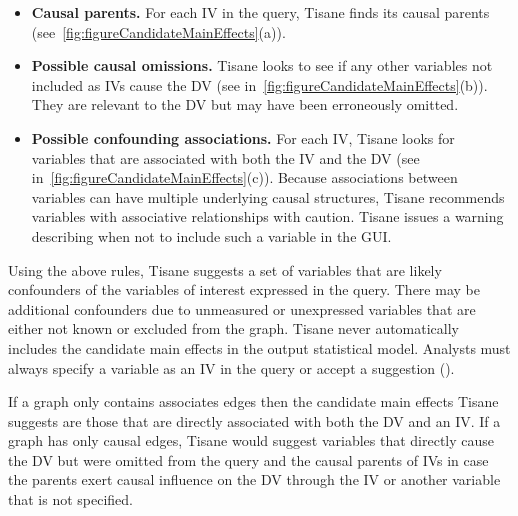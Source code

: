\begin{itemize}    
    \item \textbf{Causal parents.} For each IV in the query, Tisane finds its
    causal parents (see~\ref{fig:figureCandidateMainEffects}(a)).
    \item \textbf{Possible causal omissions.} Tisane looks to see if any other
    variables not included as IVs cause the DV 
    (see
    in~\ref{fig:figureCandidateMainEffects}(b)). They are relevant to the DV
    but may have been erroneously omitted.
    \item \textbf{Possible confounding associations.} For each IV, Tisane looks
    for variables that are associated with both the IV and the DV (see
    in~\ref{fig:figureCandidateMainEffects}(c)). Because associations
    between variables can have multiple underlying causal structures, Tisane
    recommends variables with associative relationships with caution. Tisane
    issues a warning describing when not to include such a variable in the GUI.
\end{itemize}

\figureCandidateMainEffects


Using the above rules, Tisane suggests a set of variables that are likely
confounders of the variables of interest expressed in the query. There may be
additional confounders due to unmeasured or unexpressed variables that are either
not known or excluded from the graph. Tisane never automatically includes the
candidate main effects in the output statistical model. Analysts must always
specify a variable as an IV in the query or accept a suggestion (\dcGuidance).

If a graph only contains associates edges then the candidate main effects Tisane
suggests are those that are directly associated with both the DV and an IV. If a
graph has only causal edges, Tisane would suggest variables that directly cause
the DV but were omitted from the query and the causal parents of IVs in case the
parents exert causal influence on the DV through the IV or another variable that is not
specified.


